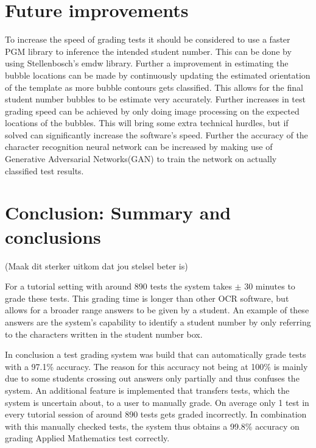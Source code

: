 \section{Future improvements}

To increase the speed of grading tests it should be considered to use a faster PGM library to inference the intended student number. This can be done by using Stellenbosch's emdw library. Further a improvement in estimating the bubble locations can be made by continuously updating the estimated orientation of the template as more bubble contours gets classified. This allows for the final student number bubbles to be estimate very accurately. Further increases in test grading speed can be achieved by only doing image processing on the expected locations of the bubbles. This will bring some extra technical hurdles, but if solved can significantly increase the software's speed. Further the accuracy of the character recognition neural network can be increased by making use of Generative Adversarial Networks(GAN) to train the network on actually classified test results.

\section{Conclusion: Summary and conclusions}


(Maak dit sterker uitkom dat jou stelsel beter is)

For a tutorial setting with around 890 tests the system takes $\pm$ 30 minutes to grade these tests. This grading time is longer than other OCR software, but allows for a broader range answers to be given by a student. An example of these answers are the system's capability to identify a student number by only referring to the characters written in the student number box.

In conclusion a test grading system was build that can automatically grade tests with a 97.1\% accuracy. The reason for this accuracy not being at 100\% is mainly due to some students crossing out answers only partially and thus confuses the system. An additional feature is implemented that transfers tests, which the system is uncertain about, to a user to manually grade. On average only 1 test in every tutorial session of around 890 tests gets graded incorrectly. In combination with this manually checked tests, the system thus obtains a 99.8\% accuracy on grading Applied Mathematics test correctly. 